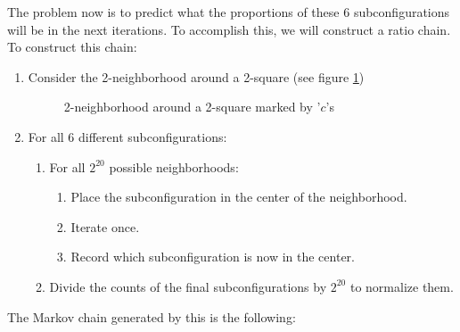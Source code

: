 \documentclass[12pt]{article}
\theoremstyle{definition}
\theoremstyle{remark}
\theoremstyle{remark}
\begin{document}
\par
The problem now is to predict what the proportions of these 6 subconfigurations will be in the next iterations. To accomplish this, we will construct a ratio chain. To construct this chain:
\begin{enumerate}
  \item{} Consider the 2-neighborhood around a 2-square (see figure \ref{2Neighborhood})
  \begin{figure}
    \label{2Neighborhood}
    \caption{2-neighborhood around a 2-square marked by '$c$'s}
    \centering
  \end{figure}
  \item{} For all 6 different subconfigurations:
  \begin{enumerate}
    \item{} For all $2^{20}$ possible neighborhoods:
    \begin{enumerate}
      \item{} Place the subconfiguration in the center of the neighborhood.
      \item{} Iterate once.
      \item{} Record which subconfiguration is now in the center.
    \end{enumerate}
    \item{} Divide the counts of the final subconfigurations by $2^{20}$ to normalize them.
  \end{enumerate}
  
\end{enumerate}
The Markov chain generated by this is the following:
\end{document}
